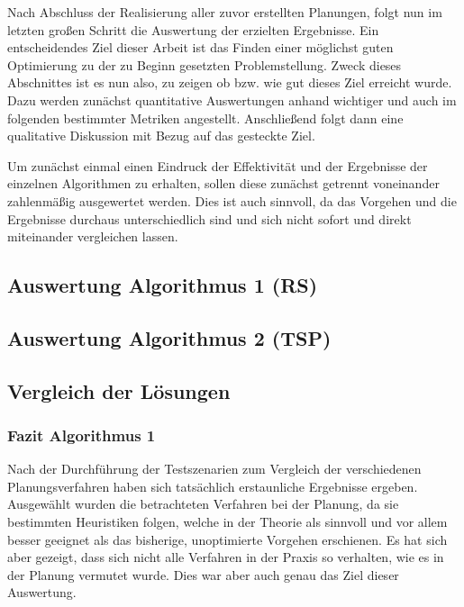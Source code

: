 

Nach Abschluss der Realisierung aller zuvor erstellten Planungen, folgt nun im letzten großen Schritt die Auswertung der erzielten Ergebnisse. Ein entscheidendes Ziel dieser Arbeit ist das Finden einer möglichst guten Optimierung zu der zu Beginn gesetzten Problemstellung. Zweck dieses Abschnittes ist es nun also, zu zeigen ob bzw. wie gut dieses Ziel erreicht wurde. Dazu werden zunächst quantitative Auswertungen anhand wichtiger und auch im folgenden bestimmter Metriken angestellt. Anschließend folgt dann eine qualitative Diskussion mit Bezug auf das gesteckte Ziel.

Um zunächst einmal einen Eindruck der Effektivität und der Ergebnisse der einzelnen Algorithmen zu erhalten, sollen diese zunächst getrennt voneinander zahlenmäßig ausgewertet werden. Dies ist auch sinnvoll, da das Vorgehen und die Ergebnisse durchaus unterschiedlich sind und sich nicht sofort und direkt miteinander vergleichen lassen.

\subsection{Auswertung Algorithmus 1 (RS)}




\subsection{Auswertung Algorithmus 2 (TSP)}




\subsection{Vergleich der Lösungen}




\subsubsection{Fazit Algorithmus 1}

Nach der Durchführung der Testszenarien zum Vergleich der verschiedenen Planungsverfahren haben sich tatsächlich erstaunliche Ergebnisse ergeben. Ausgewählt wurden die betrachteten Verfahren bei der Planung, da sie bestimmten Heuristiken folgen, welche in der Theorie als sinnvoll und vor allem besser geeignet als das bisherige, unoptimierte Vorgehen erschienen. Es hat sich aber gezeigt, dass sich nicht alle Verfahren in der Praxis so verhalten, wie es in der Planung vermutet wurde. Dies war aber auch genau das Ziel dieser Auswertung.

